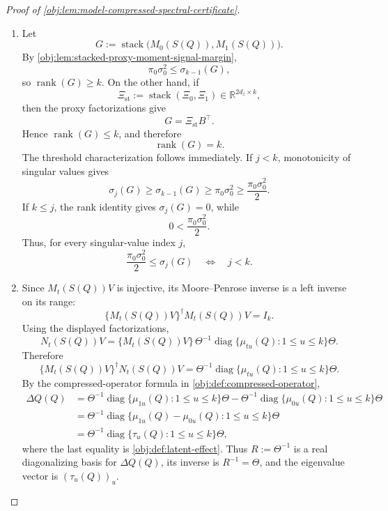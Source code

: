\documentclass[11pt]{article}
\begin{document}
\begin{proof}[Proof of \cref{obj:lem:model-compressed-spectral-certificate}]
\begin{enumerate}
\item
Let
\[
G:=\operatorname{stack}\bigl(M_0(S(Q)),M_1(S(Q))\bigr).
\]
By \cref{obj:lem:stacked-proxy-moment-signal-margin},
\[
\pi_0\sigma_0^2\le \sigma_{k-1}(G),
\]
so \(\operatorname{rank}(G)\ge k\).  On the other hand, if
\[
\Xi_{\mathrm{st}}:=\operatorname{stack}(\Xi_0,\Xi_1)\in\mathbb R^{2d_z\times k},
\]
then the proxy factorizations give
\[
G=\Xi_{\mathrm{st}}B^\top .
\]
Hence \(\operatorname{rank}(G)\le k\), and therefore
\[
\operatorname{rank}(G)=k .
\]
The threshold characterization follows immediately.  If \(j<k\), monotonicity of singular values gives
\[
\sigma_j(G)\ge\sigma_{k-1}(G)\ge\pi_0\sigma_0^2
\ge\frac{\pi_0\sigma_0^2}{2}.
\]
If \(k\le j\), the rank identity gives \(\sigma_j(G)=0\), while
\[
0<\frac{\pi_0\sigma_0^2}{2}.
\]
Thus, for every singular-value index \(j\),
\[
\frac{\pi_0\sigma_0^2}{2}\le \sigma_j(G)
\quad\Longleftrightarrow\quad
j<k .
\]

\item
Since \(M_t(S(Q))V\) is injective, its Moore--Penrose inverse is a left inverse on its range:
\[
\{M_t(S(Q))V\}^{\dagger}M_t(S(Q))V=I_k .
\]
Using the displayed factorizations,
\[
N_t(S(Q))V
=
\{M_t(S(Q))V\}\,
\Theta^{-1}\operatorname{diag}\{\mu_{tu}(Q):1\le u\le k\}\Theta .
\]
Therefore
\[
\{M_t(S(Q))V\}^{\dagger}N_t(S(Q))V
=
\Theta^{-1}\operatorname{diag}\{\mu_{tu}(Q):1\le u\le k\}\Theta .
\]
By the compressed-operator formula in \cref{obj:def:compressed-operator},
\[
\begin{aligned}
\Delta Q(Q)
&=
\Theta^{-1}\operatorname{diag}\{\mu_{1u}(Q):1\le u\le k\}\Theta
-
\Theta^{-1}\operatorname{diag}\{\mu_{0u}(Q):1\le u\le k\}\Theta  \\
&=
\Theta^{-1}\operatorname{diag}\{\mu_{1u}(Q)-\mu_{0u}(Q):1\le u\le k\}\Theta  \\
&=
\Theta^{-1}\operatorname{diag}\{\tau_u(Q):1\le u\le k\}\Theta ,
\end{aligned}
\]
where the last equality is \cref{obj:def:latent-effect}.  Thus \(R:=\Theta^{-1}\) is a real diagonalizing basis for \(\Delta Q(Q)\), its inverse is \(R^{-1}=\Theta\), and the eigenvalue vector is \((\tau_u(Q))_u\).


\end{enumerate}
\end{proof}
\end{document}
